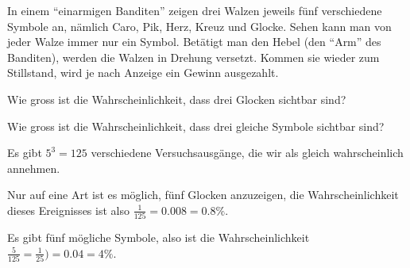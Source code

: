 In einem ``einarmigen Banditen'' zeigen drei Walzen jeweils fünf
verschiedene Symbole an, nämlich Caro, Pik, Herz, Kreuz und Glocke.
Sehen kann man von jeder Walze immer nur ein Symbol.
Betätigt man den Hebel (den ``Arm'' des Banditen),
werden die Walzen in Drehung versetzt. Kommen sie wieder zum Stillstand,
wird je nach Anzeige ein Gewinn ausgezahlt.
\begin{teilaufgaben}
\item
Wie gross ist die Wahrscheinlichkeit, dass drei Glocken sichtbar sind?
\item
Wie gross ist die Wahrscheinlichkeit, dass drei gleiche Symbole
sichtbar sind?
\end{teilaufgaben}

\begin{loesung}
Es gibt $5^3=125$ verschiedene Versuchsausgänge, die wir als gleich
wahrscheinlich annehmen.
\begin{teilaufgaben}
\item Nur auf eine Art ist es möglich, fünf Glocken anzuzeigen, die
Wahrscheinlichkeit dieses Ereignisses ist also $\frac1{125}=0.008=0.8\%$.
\item Es gibt fünf mögliche Symbole, also ist die Wahrscheinlichkeit
$\frac{5}{125}=\frac1{25})=0.04=4\%$.
\qedhere
\end{teilaufgaben}
\end{loesung}


